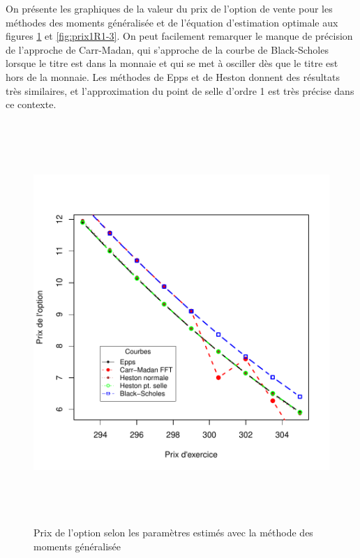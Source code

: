 On présente les graphiques de la valeur du prix de l'option de vente
pour les méthodes des moments généralisée et de l'équation d'estimation
optimale aux figures \ref{fig:prix1R1-1} et \ref{fig:prix1R1-3}.  On
peut facilement remarquer le manque de précision de l'approche de
Carr-Madan, qui s'approche de la courbe de Black-Scholes lorsque le
titre est dans la monnaie et qui se met à osciller dès que le titre
est hors de la monnaie. Les méthodes de Epps et de Heston donnent des
résultats très similaires, et l'approximation du point de selle
d'ordre 1 est très précise dans ce contexte.
\begin{figure}[!ht]
  \centering
  \includegraphics[height=6in,
  width=6in]{../graphiques/ABBEYN-callGAL-7.pdf}
  \caption{Prix de l'option selon les paramètres estimés avec la
    méthode des moments généralisée}
  \label{fig:prix1R1-1}
\end{figure}

